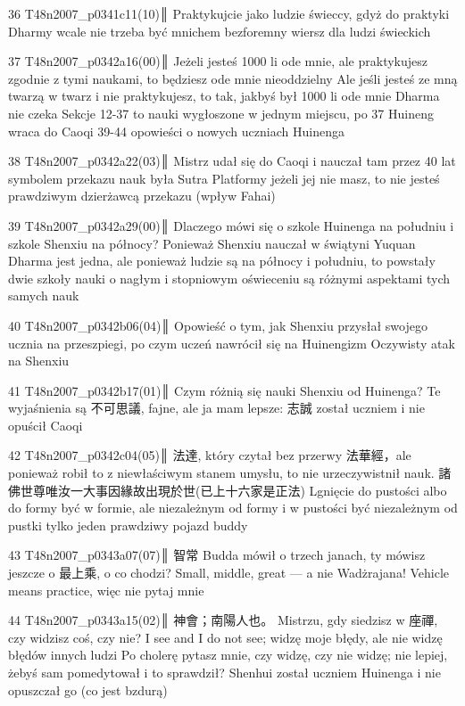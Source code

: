 36 T48n2007_p0341c11(10)║
Praktykujcie jako ludzie świeccy, gdyż do praktyki Dharmy wcale nie trzeba być mnichem
bezforemny wiersz dla ludzi świeckich

37 T48n2007_p0342a16(00)║
Jeżeli jesteś 1000 li ode mnie, ale praktykujesz zgodnie z tymi naukami, to będziesz ode mnie nieoddzielny
Ale jeśli jesteś ze mną twarzą w twarz i nie praktykujesz, to tak, jakbyś był 1000 li ode mnie
Dharma nie czeka
Sekcje 12-37 to nauki wygłoszone w jednym miejscu, po 37 Huineng wraca do Caoqi
39-44 opowieści o nowych uczniach Huinenga

38 T48n2007_p0342a22(03)║
Mistrz udał się do Caoqi i nauczał tam przez 40 lat
symbolem przekazu nauk była Sutra Platformy
jeżeli jej nie masz, to nie jesteś prawdziwym dzierżawcą przekazu (wpływ Fahai)

39 T48n2007_p0342a29(00)║
Dlaczego mówi się o szkole Huinenga na południu i szkole Shenxiu na północy? Ponieważ Shenxiu nauczał w świątyni Yuquan
Dharma jest jedna, ale ponieważ ludzie są na północy i południu, to powstały dwie szkoły
nauki o nagłym i stopniowym oświeceniu są różnymi aspektami tych samych nauk

40 T48n2007_p0342b06(04)║
Opowieść o tym, jak Shenxiu przysłał swojego ucznia na przeszpiegi, po czym uczeń nawrócił się na Huinengizm
Oczywisty atak na Shenxiu

41 T48n2007_p0342b17(01)║
Czym różnią się nauki Shenxiu od Huinenga?
Te wyjaśnienia są 不可思議, fajne, ale ja mam lepsze:
志誠 został uczniem i nie opuścił Caoqi

42 T48n2007_p0342c04(05)║
法達, który czytał bez przerwy 法華經，ale ponieważ robił to z niewłaściwym stanem umysłu, to nie urzeczywistnił nauk. 諸佛世尊唯汝一大事因緣故出現於世(已上十六家是正法)
Lgnięcie do pustości albo do formy
być w formie, ale niezależnym od formy i w pustości być niezależnym od pustki
tylko jeden prawdziwy pojazd buddy

43 T48n2007_p0343a07(07)║
智常
Budda mówił o trzech janach, ty mówisz jeszcze o 最上乘, o co chodzi?
Small, middle, great --- a nie Wadżrajana!
Vehicle means practice, więc nie pytaj mnie

44 T48n2007_p0343a15(02)║
神會；南陽人也。
Mistrzu, gdy siedzisz w 座禪, czy widzisz coś, czy nie?
I see and I do not see; widzę moje błędy, ale nie widzę błędów innych ludzi
Po cholerę pytasz mnie, czy widzę, czy nie widzę; nie lepiej, żebyś sam pomedytował i to sprawdził?
Shenhui został uczniem Huinenga i nie opuszczał go (co jest bzdurą)

